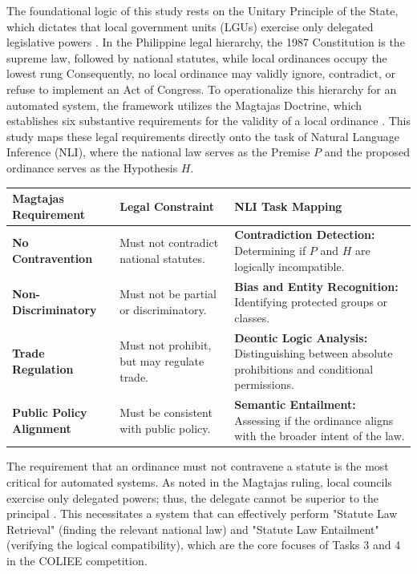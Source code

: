 The foundational logic of this study rests on the Unitary Principle of the State, which dictates that local government units (LGUs) exercise only delegated legislative powers \cite{philgov1991ra7160}. In the Philippine legal hierarchy, the 1987 Constitution is the supreme law, followed by national statutes, while local ordinances occupy the lowest rung \cite{philgov1991ra7160} Consequently, no local ordinance may validly ignore, contradict, or refuse to implement an Act of Congress.
To operationalize this hierarchy for an automated system, the framework utilizes the Magtajas Doctrine, which establishes six substantive requirements for the validity of a local ordinance \cite{scp1994magtajasvpryce}. This study maps these legal requirements directly onto the task of Natural Language Inference (NLI), where the national law serves as the Premise $P$ and the proposed ordinance serves as the Hypothesis $H$.

\noindent
\begin{tabularx}{1\textwidth} { 
    @{}
  | >{\raggedright\arraybackslash}X 
  | >{\raggedright\arraybackslash}X 
  | >{\raggedright\arraybackslash}X | 
  @{}}
 \hline
 \textbf{Magtajas Requirement}
 & \textbf{Legal Constraint}
 & \textbf{NLI Task Mapping} \\
 \hline
 \textbf{No Contravention}  
 & Must not contradict national statutes.  
 &\textbf{Contradiction Detection: }Determining if $P$ and $H$ are logically incompatible.  \\
\hline
\textbf{Non-Discriminatory}
&Must not be partial or discriminatory.
&\textbf{Bias and Entity Recognition:} Identifying protected groups or classes.\\
\hline
\textbf{Trade Regulation}
& Must not prohibit, but may regulate trade.
&\textbf{Deontic Logic Analysis:} Distinguishing between absolute prohibitions and conditional permissions. \\
\hline
\textbf{Public Policy Alignment}
& Must be consistent with public policy.
&\textbf{Semantic Entailment:} Assessing if the ordinance aligns with the broader intent of the law. \\
\hline
\end{tabularx}

The requirement that an ordinance must not contravene a statute is the most critical for automated systems. As noted in the Magtajas ruling, local councils exercise only delegated powers; thus, the delegate cannot be superior to the principal \cite{scp1994magtajasvpryce}. This necessitates a system that can effectively perform "Statute Law Retrieval" (finding the relevant national law) and "Statute Law Entailment" (verifying the logical compatibility), which are the core focuses of Tasks 3 and 4 in the COLIEE competition.



